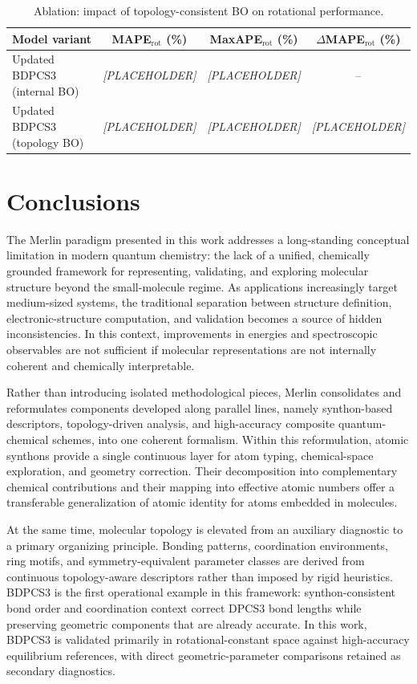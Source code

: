 \documentclass[journal=jctcce,manuscript=article]{achemso}
\begin{document}
\begin{table}[ht]
\caption{Ablation: impact of topology-consistent BO on rotational performance.}
\label{tab:ablation_bo}
\centering
\begin{tabular}{lccc}
\toprule
Model variant & MAPE$_\mathrm{rot}$ (\%) & MaxAPE$_\mathrm{rot}$ (\%) & $\Delta$MAPE$_\mathrm{rot}$ (\%) \\
\midrule
Updated BDPCS3 (internal BO) & \textit{[PLACEHOLDER]} & \textit{[PLACEHOLDER]} & -- \\
Updated BDPCS3 (topology BO) & \textit{[PLACEHOLDER]} & \textit{[PLACEHOLDER]} & \textit{[PLACEHOLDER]} \\
\bottomrule
\end{tabular}
\end{table}

\section{Conclusions}
The Merlin paradigm presented in this work addresses a long-standing conceptual limitation in modern quantum chemistry: the lack of a unified, chemically grounded framework for representing, validating, and exploring molecular structure beyond the small-molecule regime. As applications increasingly target medium-sized systems, the traditional separation between structure definition, electronic-structure computation, and validation becomes a source of hidden inconsistencies. In this context, improvements in energies and spectroscopic observables are not sufficient if molecular representations are not internally coherent and chemically interpretable.

Rather than introducing isolated methodological pieces, Merlin consolidates and reformulates components developed along parallel lines, namely synthon-based descriptors, topology-driven analysis, and high-accuracy composite quantum-chemical schemes, into one coherent formalism. Within this reformulation, atomic synthons provide a single continuous layer for atom typing, chemical-space exploration, and geometry correction. Their decomposition into complementary chemical contributions and their mapping into effective atomic numbers offer a transferable generalization of atomic identity for atoms embedded in molecules.

At the same time, molecular topology is elevated from an auxiliary diagnostic to a primary organizing principle. Bonding patterns, coordination environments, ring motifs, and symmetry-equivalent parameter classes are derived from continuous topology-aware descriptors rather than imposed by rigid heuristics. BDPCS3 is the first operational example in this framework: synthon-consistent bond order and coordination context correct DPCS3 bond lengths while preserving geometric components that are already accurate. In this work, BDPCS3 is validated primarily in rotational-constant space against high-accuracy equilibrium references, with direct geometric-parameter comparisons retained as secondary diagnostics.
\end{document}
